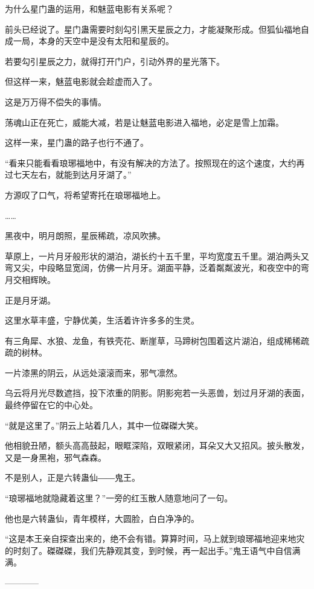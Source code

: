 \begin{this_body}
为什么星门蛊的运用，和魅蓝电影有关系呢？

前头已经说了。星门蛊需要时刻勾引黑天星辰之力，才能凝聚形成。但狐仙福地自成一局，本身的天空中是没有太阳和星辰的。

若要勾引星辰之力，就得打开门户，引动外界的星光落下。

但这样一来，魅蓝电影就会趁虚而入了。

这是万万得不偿失的事情。

荡魂山正在死亡，威能大减，若是让魅蓝电影进入福地，必定是雪上加霜。

这样一来，星门蛊的路子也行不通了。

“看来只能看看琅琊福地中，有没有解决的方法了。按照现在的这个速度，大约再过七天左右，就能到达月牙湖了。”

方源叹了口气，将希望寄托在琅琊福地上。

……

黑夜中，明月朗照，星辰稀疏，凉风吹拂。

草原上，一片月牙般形状的湖泊，湖长约十五千里，平均宽度五千里。湖泊两头又弯又尖，中段略显宽阔，仿佛一片月牙。湖面平静，泛着粼粼波光，和夜空中的弯月交相辉映。

正是月牙湖。

这里水草丰盛，宁静优美，生活着许许多多的生灵。

有三角犀、水狼、龙鱼，有铁壳花、断崖草，马蹄树包围着这片湖泊，组成稀稀疏疏的树林。

一片漆黑的阴云，从远处滚滚而来，邪气凛然。

乌云将月光尽数遮挡，投下浓重的阴影。阴影宛若一头恶兽，划过月牙湖的表面，最终停留在它的中心处。

“就是这里了。”阴云上站着几人，其中一位磔磔大笑。

他相貌丑陋，额头高高鼓起，眼眶深陷，双眼紧闭，耳朵又大又招风。披头散发，又是一身黑袍，邪气森森。

不是别人，正是六转蛊仙――鬼王。

“琅琊福地就隐藏着这里？”一旁的红玉散人随意地问了一句。

他也是六转蛊仙，青年模样，大圆脸，白白净净的。

“这是本王亲自探查出来的，绝不会有错。算算时间，马上就到琅琊福地迎来地灾的时刻了。磔磔磔，我们先静观其变，到时候，再一起出手。”鬼王语气中自信满满。

------------

\end{this_body}

